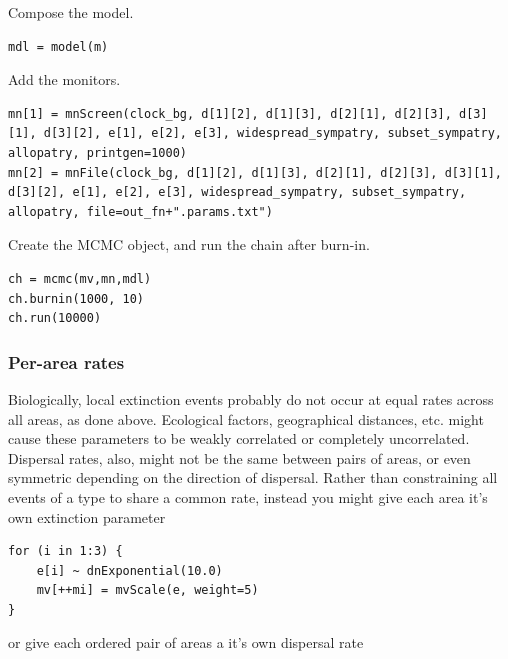 Compose the model.

\begin{snugshade}
\begin{lstlisting}
mdl = model(m)
\end{lstlisting}
\end{snugshade}

Add the monitors.

\begin{snugshade}
\begin{lstlisting}
mn[1] = mnScreen(clock_bg, d[1][2], d[1][3], d[2][1], d[2][3], d[3][1], d[3][2], e[1], e[2], e[3], widespread_sympatry, subset_sympatry, allopatry, printgen=1000)
mn[2] = mnFile(clock_bg, d[1][2], d[1][3], d[2][1], d[2][3], d[3][1], d[3][2], e[1], e[2], e[3], widespread_sympatry, subset_sympatry, allopatry, file=out_fn+".params.txt")
\end{lstlisting}
\end{snugshade}

Create the MCMC object, and run the chain after burn-in.
\begin{snugshade}
\begin{lstlisting}
ch = mcmc(mv,mn,mdl)
ch.burnin(1000, 10)
ch.run(10000)
\end{lstlisting}
\end{snugshade}

\subsubsection{Per-area rates}

Biologically, local extinction events probably do not occur at equal rates across all areas, as done above.
Ecological factors, geographical distances, etc. might cause these parameters to be weakly correlated or completely uncorrelated.
Dispersal rates, also, might not be the same between pairs of areas, or even symmetric depending on the direction of dispersal.
Rather than constraining all events of a type to share a common rate, instead you might give each area it's own extinction parameter

\begin{snugshade}
\begin{lstlisting}
for (i in 1:3) {
    e[i] ~ dnExponential(10.0)
    mv[++mi] = mvScale(e, weight=5)
}
\end{lstlisting}
\end{snugshade}

or give each ordered pair of areas a it's own dispersal rate

